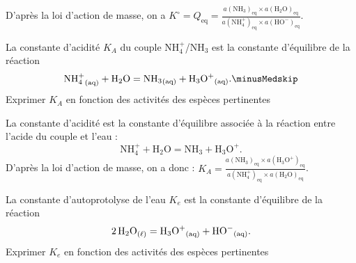
\begin{corrige}
D'après la loi d'action de masse, on a  $K^\circ=Q_\text{eq}=\frac{a(\text{NH}_3)_\text{eq}\times a(\text{H}_2\text{O})_\text{eq}}{a(\text{NH}^+_4)_\text{eq}\times a(\text{HO}^-)_\text{eq}}$.
\end{corrige}





\begin{enonce}
La constante d'acidité $K_A$ du couple NH$^+_4$/NH$_3$ est la constante d'équilibre de la réaction 
\[
\mathrm{NH_4^+}_\text{(aq)}+\mathrm{H_2O=NH_3}_\text{(aq)}+\mathrm{H_3O^+}_\text{(aq)}.\minusMedskip
\]
Exprimer $K_A$ en fonction des activités des espèces pertinentes
\end{enonce}


\begin{corrige}
La constante d'acidité est la constante d'équilibre associée à la réaction entre l'acide du couple et l'eau : \minusMedskip
\[
\text{NH}^+_4 + \text{H}_2\text{O}=\text{NH}_3 + \text{H}_3\text{O}^+.
\]
D'après la loi d'action de masse, on a donc : $K_A=\frac{a(\text{NH}_3)_\text{eq}\times a(\text{H}_3\text{O}^+)_\text{eq}}{a(\text{NH}^+_4)_\text{eq}\times a(\text{H}_2\text{O})_\text{eq}}$.
\end{corrige}



\begin{enonce}
La constante d'autoprotolyse de l'eau $K_e$ est la constante d'équilibre de la réaction
\[
2\,{\mathrm{H_2O}}_\text{($\ell$)}=\mathrm{H_3O^+}_\text{(aq)}+\mathrm{HO^-}_\text{(aq)}.\vspace{-3mm}
\]
Exprimer $K_e$ en fonction des activités des espèces pertinentes
\end{enonce}

